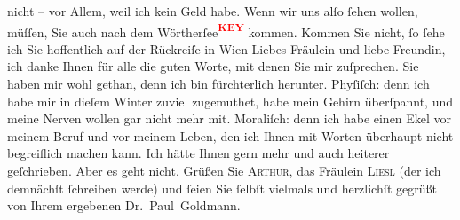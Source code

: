 \begin{ledgroupsized}[t]{13cm}
               nicht – vor Allem, weil ich kein Geld habe. Wenn wir uns alſo ſehen wollen, müſſen,
               Sie auch nach dem Wörtherſee\textcolor{red}{\textsuperscript{\textbf{KEY}}} kommen. Kommen Sie nicht,
               ſo ſehe ich Sie hoffentlich auf der Rückreiſe in Wien\pend
           \pstart
           Liebes Fräulein und liebe Freundin, ich danke Ihnen für alle die guten Worte, mit
               denen Sie mir zuſprechen. Sie haben mir wohl gethan, denn ich bin fürchterlich
               herunter. {\pb} Phyſiſch: denn ich
               habe mir in dieſem Winter zuviel zugemuthet, habe mein Gehirn überſpannt, und meine
               Nerven wollen gar nicht mehr mit. Moraliſch: denn ich habe einen Ekel vor meinem
               Beruf und vor meinem Leben, den ich Ihnen mit Worten überhaupt nicht begreiflich
               machen kann. Ich hätte Ihnen gern mehr und auch heiterer geſchrieben. Aber es geht
               nicht. Grüßen Sie \textsc{Arthur}, das Fräulein \textsc{Liesl} (der ich demnächſt ſchreiben werde) und ſeien Sie ſelbſt vielmals und
               herzlichſt gegrüßt von Ihrem ergebenen \spacefill\mbox{Dr. Paul Goldmann. }\pend
           
         
         \endnumbering{}\end{ledgroupsized}\begin{anhang}\end{anhang}\newcommand{\dateiname}{L03528}\newcommand{\titel}{Paul Goldmann an Olga Gussmann, 28. 5. [1901]}\newcommand{\editorInnen}{Martin Anton Müller und Laura Untner}
      
